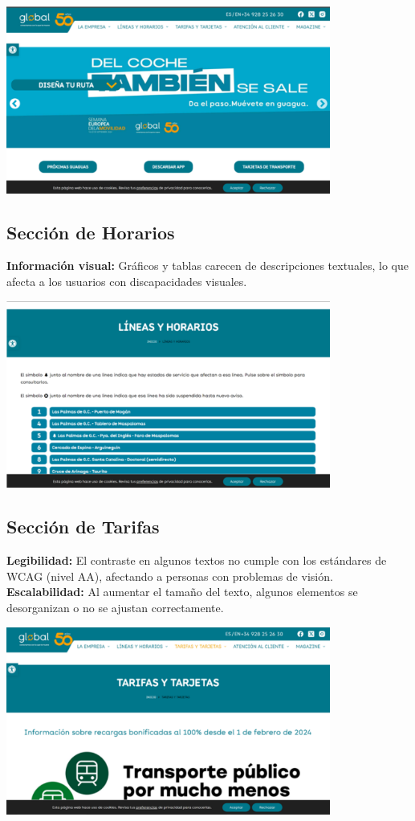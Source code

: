 \documentclass[a4paper,12pt]{article}
\begin{document}
\vspace{0.3cm}
\includegraphics[width=0.8\textwidth]{Images/global_landing_page.png}

\subsection{Sección de Horarios}
\textbf{Información visual:} Gráficos y tablas carecen de descripciones textuales, lo que afecta a los usuarios con discapacidades visuales.

\vspace{0.3cm}
\includegraphics[width=0.8\textwidth]{Images/global_horarios.png}

\newpage

\subsection{Sección de Tarifas}
\textbf{Legibilidad:} El contraste en algunos textos no cumple con los estándares de WCAG (nivel AA), afectando a personas con problemas de visión.\\
\textbf{Escalabilidad:} Al aumentar el tamaño del texto, algunos elementos se desorganizan o no se ajustan correctamente.

\vspace{0.3cm}
\includegraphics[width=0.8\textwidth]{Images/global_tarifas.png}
\end{document}
